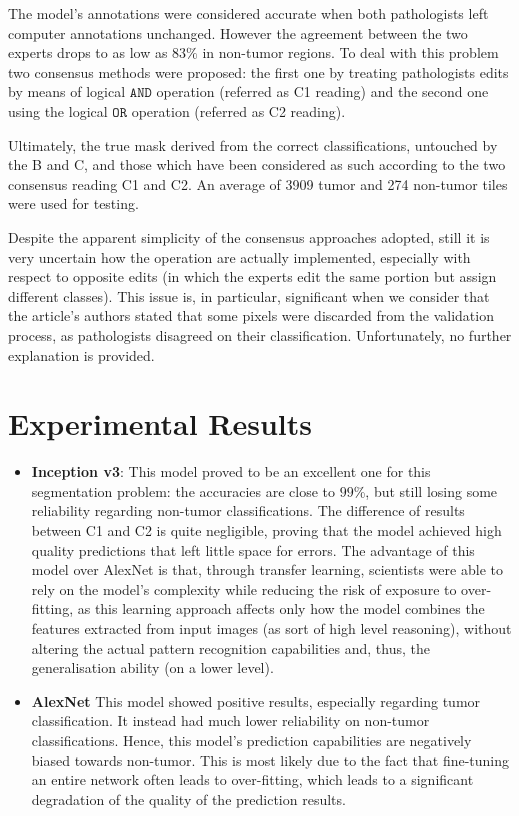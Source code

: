The model's annotations were considered accurate when both pathologists left computer annotations unchanged. However the agreement between the two experts drops to as low as $83\%$ in non-tumor regions. To deal with this problem two consensus methods were proposed: the first one by treating pathologists edits by means of logical $\texttt{AND}$ operation (referred as C1 reading) and the second one using the logical $\texttt{OR}$ operation (referred as C2 reading).

Ultimately, the true mask derived from the correct classifications, untouched by the B and C, and those which have been considered as such according to the two consensus reading C1 and C2. An average of 3909 tumor and 274 non-tumor tiles were used for testing.

\subtitle{Remarks} 
Despite the apparent simplicity of the consensus approaches adopted, still it is very uncertain how the operation are actually implemented, especially with respect to opposite edits (in which the experts edit the same portion but assign different classes).
This issue is, in particular, significant when we consider that the article's authors stated that some pixels were discarded from the validation process, as pathologists disagreed on their classification.
Unfortunately, no further explanation is provided.

\section{Experimental Results}

\begin{itemize}
    \item \textbf{Inception v3}:
    This model proved to be an excellent one for this segmentation problem: the accuracies are close to $99$\%, but still losing some reliability regarding non-tumor classifications. The difference of results between C1 and C2 is quite negligible, proving that the model achieved high quality predictions that left little space for errors. The advantage of this model over AlexNet is that, through transfer learning, scientists were able to rely on the model's complexity while reducing the risk of exposure to over-fitting, as this learning approach affects only how the model combines the features extracted from input images (as sort of high level reasoning), without altering the actual pattern recognition capabilities and, thus, the generalisation ability (on a lower level).
    \item \textbf{AlexNet}
    This model showed positive results, especially regarding tumor classification. It instead had much lower reliability on non-tumor classifications. Hence, this model's prediction capabilities are negatively biased towards non-tumor. This is most likely due to the fact that fine-tuning an entire network often leads to over-fitting, which leads to a significant degradation of the quality of the prediction results.
\end{itemize}